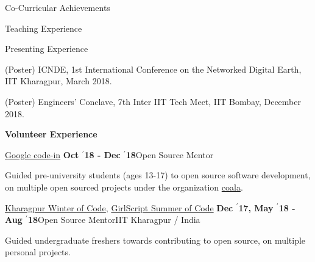 \documentclass{resume} %
\begin{document}
\begin{rSection}{Co-Curricular Achievements}
\begin{rSubsection}{\large Teaching Experience}{}{}{}
\end{rSubsection}


\begin{rSubsection}{\large Presenting Experience}{}{}{}
\item (Poster) ICNDE, 1st International Conference on the Networked Digital Earth, IIT Kharagpur, March 2018.
\item (Poster) Engineers' Conclave, 7th Inter IIT Tech Meet, IIT Bombay, December 2018.

\end{rSubsection}




{\large {\textbf{Volunteer Experience}}

\begin{rSubsection}{\large \href{https://codein.withgoogle.com/}{Google code-in}}{\textbf{ Oct $^{\prime}$18 - Dec $^{\prime}$18}}{Open Source Mentor}{}
\item Guided pre-university students (ages 13-17) to open source software development, on multiple open sourced projects under the organization \href{http://coala.io}{coala}.
\end{rSubsection}

\begin{rSubsection}{\large \href{https://kwoc.kossiitkgp.in/}{Kharagpur Winter of Code}, \href{https://gssoc.tech/projects.html\#facebook-archive}{GirlScript Summer of Code}}{\textbf{ Dec $^{\prime}$17, May $^{\prime}$18 - Aug $^{\prime}$18}}{Open Source Mentor}{IIT Kharagpur / India}
\item Guided undergraduate freshers towards contributing to open source, on multiple personal projects.
\end{rSubsection}

}
\end{rSection}
\end{document}
